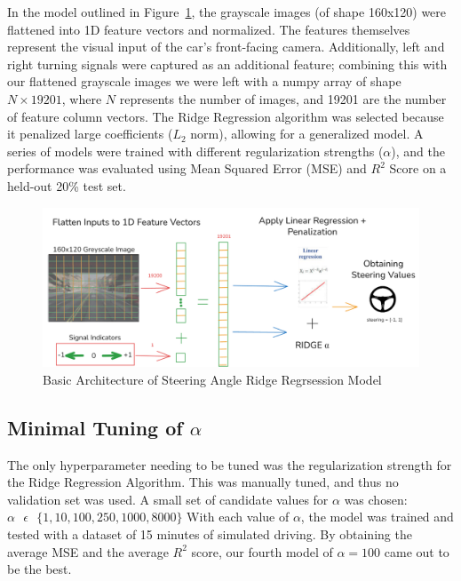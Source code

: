 \documentclass{article} %
\begin{document}
In the model outlined in Figure~\ref{fig:diagram}, the grayscale images (of shape 160x120) were flattened into 1D feature vectors and normalized. The features themselves
represent the visual input of the car's front-facing camera. Additionally, left and right turning signals were captured as an
additional feature; combining this with our flattened grayscale images we were left with a numpy array of shape $N \times 19201$,
where $N$ represents the number of images, and 19201 are the number of feature column vectors. The Ridge Regression algorithm was
selected because it penalized large coefficients ($L_2$ norm), allowing for a generalized model. A series of models were trained
with different regularization strengths ($\alpha$), and the performance was evaluated using Mean Squared Error (MSE) and $R^2$ Score
on a held-out 20\% test set. 

\begin{figure}[H] %
    \centering
    \includegraphics[width=1.0\textwidth]{diagram.png} %
    \caption{Basic Architecture of Steering Angle Ridge Regrsession Model}
    \label{fig:diagram}
\end{figure}


\subsection{Minimal Tuning of $\alpha$}
The only hyperparameter needing to be tuned was the regularization strength for the Ridge Regression Algorithm. This was manually tuned,
and thus no validation set was used. A small set of candidate values for $\alpha$ was chosen: $\alpha \text{ } \epsilon \text{ } 
\{ 1, 10, 100, 250, 1000, 8000\}$ With each value of $\alpha$, the model was trained and tested with a dataset of 15 minutes of simulated
driving. By obtaining the average MSE and the average $R^2$ score, our fourth model of $\alpha = 100$ came out to be the best. 
\end{document}
